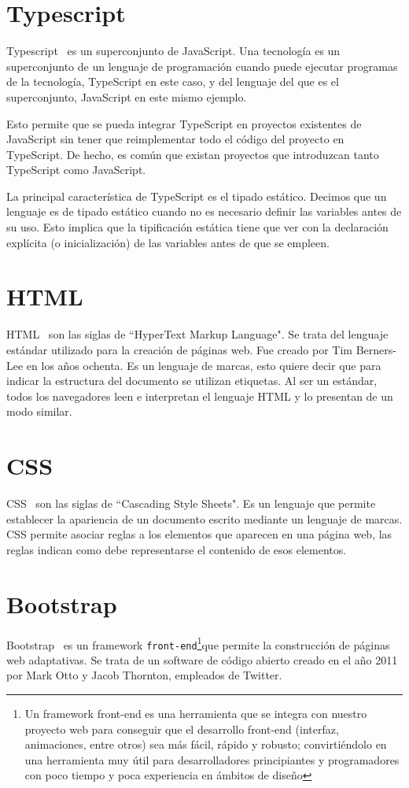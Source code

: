 \documentclass[a4paper, 12pt]{book}
\begin{document}
\section{Typescript}
\label{sec:Typescript}
Typescript~\cite{typescript} es un superconjunto de JavaScript. Una tecnología es un superconjunto de un lenguaje de programación cuando puede ejecutar programas de la tecnología, TypeScript en este caso, y del lenguaje del que es el superconjunto, JavaScript en este mismo ejemplo.

	Esto permite que se pueda integrar TypeScript en proyectos existentes de JavaScript sin tener que reimplementar todo el código del proyecto en TypeScript. De hecho, es común que existan proyectos que introduzcan tanto TypeScript como JavaScript.
	
	La principal característica de TypeScript es el tipado estático. Decimos que un lenguaje es de tipado estático cuando no es necesario definir las variables antes de su uso. Esto implica que la tipificación estática tiene que ver con la declaración explícita (o inicialización) de las variables antes de que se empleen.


\section{HTML}
\label{sec:HTML}
HTML~\cite{HTML}  son las siglas de ``HyperText Markup Language". Se trata del lenguaje estándar utilizado para la creación de páginas web. Fue creado por Tim Berners-Lee en los años ochenta. Es un lenguaje de marcas, esto quiere decir que para indicar la estructura del documento se utilizan etiquetas. Al ser un estándar, todos los navegadores leen e interpretan el lenguaje HTML y lo presentan de un modo similar.

\clearpage

\section{CSS}
\label{sec:CSS}
CSS~\cite{CSS3} son las siglas de ``Cascading Style Sheets". Es un lenguaje que permite establecer la apariencia de un documento escrito mediante un lenguaje de marcas. CSS permite asociar reglas a los elementos que aparecen en una página web, las reglas indican como debe representarse el contenido de esos elementos.

\section{Bootstrap}
\label{sec:Bootstrap}
Bootstrap~\cite{bootstrap} es un framework \texttt{front-end}\footnote{Un framework front-end es una herramienta que se integra con nuestro proyecto web para conseguir que el desarrollo front-end (interfaz, animaciones, entre otros) sea más fácil, rápido y robusto; convirtiéndolo en una herramienta muy útil para desarrolladores principiantes y programadores con poco tiempo y poca experiencia en ámbitos de diseño}que permite la construcción de páginas web adaptativas. Se trata de un software de código abierto creado en el año 2011 por Mark Otto y Jacob Thornton, empleados de Twitter.
\end{document}
